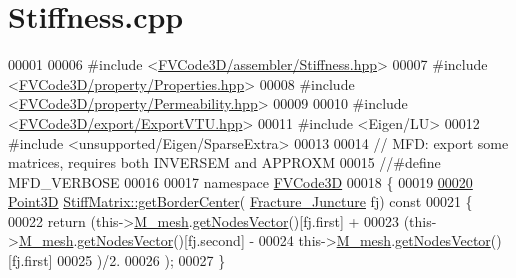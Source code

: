 \hypertarget{Stiffness_8cpp_source}{}\section{Stiffness.\+cpp}
\label{Stiffness_8cpp_source}

\begin{DoxyCode}
00001 
00006 \textcolor{preprocessor}{#include <\hyperlink{Stiffness_8hpp}{FVCode3D/assembler/Stiffness.hpp}>}
00007 \textcolor{preprocessor}{#include <\hyperlink{Properties_8hpp}{FVCode3D/property/Properties.hpp}>}
00008 \textcolor{preprocessor}{#include <\hyperlink{Permeability_8hpp}{FVCode3D/property/Permeability.hpp}>}
00009 
00010 \textcolor{preprocessor}{#include <\hyperlink{ExportVTU_8hpp}{FVCode3D/export/ExportVTU.hpp}>}
00011 \textcolor{preprocessor}{#include <Eigen/LU>}
00012 \textcolor{preprocessor}{#include <unsupported/Eigen/SparseExtra>}
00013 
00014 \textcolor{comment}{// MFD: export some matrices, requires both INVERSEM and APPROXM}
00015 \textcolor{comment}{//#define MFD\_VERBOSE}
00016 
00017 \textcolor{keyword}{namespace }\hyperlink{namespaceFVCode3D}{FVCode3D}
00018 \{
00019 
\hypertarget{Stiffness_8cpp_source.tex_l00020}{}\hyperlink{classFVCode3D_1_1StiffMatrix_a2702adc80c0667f24005a16672de0d39}{00020} \hyperlink{classFVCode3D_1_1Point3D}{Point3D} \hyperlink{classFVCode3D_1_1StiffMatrix_a2702adc80c0667f24005a16672de0d39}{StiffMatrix::getBorderCenter}(
      \hyperlink{classFVCode3D_1_1StiffMatrix_ab6572f8976a3d7fc0d54d73888764252}{Fracture\_Juncture} fj)\textcolor{keyword}{ const}
00021 \textcolor{keyword}{}\{
00022     \textcolor{keywordflow}{return} (this->\hyperlink{classFVCode3D_1_1MatrixHandler_a72f185cb557fc2e8023bd09a074f685c}{M\_mesh}.\hyperlink{classFVCode3D_1_1Rigid__Mesh_a7acee1523c8da4596273627acc652609}{getNodesVector}()[fj.first] +
00023                 (this->\hyperlink{classFVCode3D_1_1MatrixHandler_a72f185cb557fc2e8023bd09a074f685c}{M\_mesh}.\hyperlink{classFVCode3D_1_1Rigid__Mesh_a7acee1523c8da4596273627acc652609}{getNodesVector}()[fj.second] -
00024                  this->\hyperlink{classFVCode3D_1_1MatrixHandler_a72f185cb557fc2e8023bd09a074f685c}{M\_mesh}.\hyperlink{classFVCode3D_1_1Rigid__Mesh_a7acee1523c8da4596273627acc652609}{getNodesVector}()[fj.first]
00025                 )/2.
00026            );
00027 \}

\end{DoxyCode}
